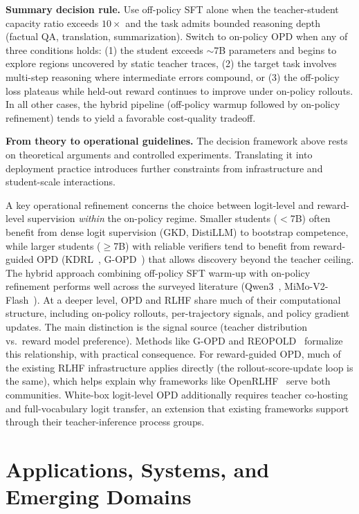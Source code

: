\documentclass{article} %
\begin{document}
\textbf{Summary decision rule.} Use off-policy SFT alone when the teacher-student capacity ratio exceeds $10{\times}$ and the task admits bounded reasoning depth (factual QA, translation, summarization). Switch to on-policy OPD when any of three conditions holds: (1) the student exceeds $\sim$7B parameters and begins to explore regions uncovered by static teacher traces, (2) the target task involves multi-step reasoning where intermediate errors compound, or (3) the off-policy loss plateaus while held-out reward continues to improve under on-policy rollouts. In all other cases, the hybrid pipeline (off-policy warmup followed by on-policy refinement) tends to yield a favorable cost-quality tradeoff.

\textbf{From theory to operational guidelines.} The decision framework above rests on theoretical arguments and controlled experiments. Translating it into deployment practice introduces further constraints from infrastructure and student-scale interactions.

A key operational refinement concerns the choice between logit-level and reward-level supervision \emph{within} the on-policy regime. Smaller students ($<$7B) often benefit from dense logit supervision (GKD, DistiLLM) to bootstrap competence, while larger students ($\ge$7B) with reliable verifiers tend to benefit from reward-guided OPD (KDRL~\citep{2506.02208}, G-OPD~\citep{2602.12125}) that allows discovery beyond the teacher ceiling. The hybrid approach combining off-policy SFT warm-up with on-policy refinement performs well across the surveyed literature (Qwen3~\citep{2505.09388}, MiMo-V2-Flash~\citep{2601.02780}). At a deeper level, OPD and RLHF share much of their computational structure, including on-policy rollouts, per-trajectory signals, and policy gradient updates. The main distinction is the signal source (teacher distribution vs.\ reward model preference). Methods like G-OPD and REOPOLD~\citep{2603.11137} formalize this relationship, with practical consequence. For reward-guided OPD, much of the existing RLHF infrastructure applies directly (the rollout-score-update loop is the same), which helps explain why frameworks like OpenRLHF~\citep{2405.11143} serve both communities. White-box logit-level OPD additionally requires teacher co-hosting and full-vocabulary logit transfer, an extension that existing frameworks support through their teacher-inference process groups.



\section{Applications, Systems, and Emerging Domains}
\label{sec:applications}
\end{document}
